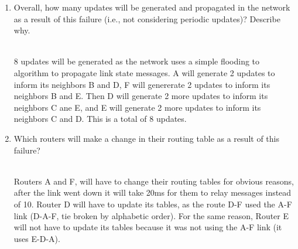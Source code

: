 \documentclass{report}
\begin{document}
\begin{problem}
\begin{enumerate}
\item Overall, how many updates will be generated and propagated in the network as a result of this failure (i.e., not considering periodic updates)? Describe why. \\ \\
\begin{answer}{6em}
  8 updates will be generated as the network uses a simple flooding to algorithm
  to propagate link state messages. A will generate 2 updates to inform its neighbors B and
  D, F will genererate 2 updates to inform its neighbors B and E. Then D will
  generate 2 more updates to inform its neighbors C ane E, and E will generate
  2 more updates to inform its neighbors C and D. This is a total of 8 updates.
\end{answer}
\item Which routers will make a change in their routing table as a result of this failure? \\ \\
\begin{answer}{6em}
  Routers A and F, will have to change their routing tables for obvious reasons,
  after the link went down it will take 20ms for them to relay messages instead
  of 10. Router D will have to update its tables, as the route D-F used the A-F
  link (D-A-F, tie broken by alphabetic order). For the same reason, Router E will not have to update
  its tables because it was not using the A-F link (it uses E-D-A).
\end{answer}
\end{enumerate}

\end{problem}
\end{document}

